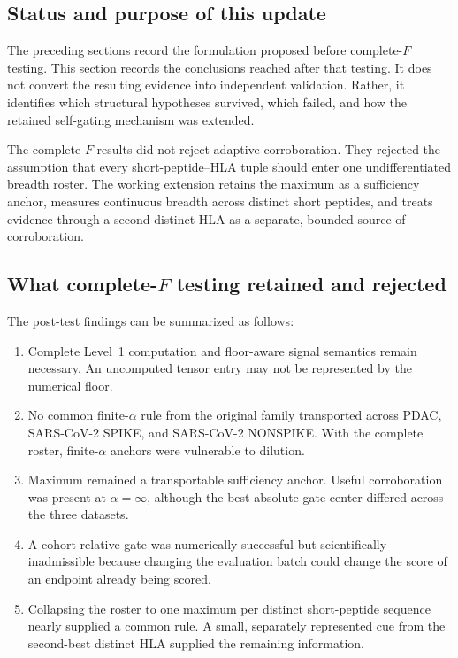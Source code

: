 \documentclass[11pt]{article}
\begin{document}
\subsection{Status and purpose of this update}

The preceding sections record the formulation proposed before complete-$F$
testing. This section records the conclusions reached after that testing. It
does not convert the resulting evidence into independent validation. Rather,
it identifies which structural hypotheses survived, which failed, and how the
retained self-gating mechanism was extended.

The complete-$F$ results did not reject adaptive corroboration. They rejected
the assumption that every short-peptide--HLA tuple should enter one
undifferentiated breadth roster. The working extension retains the maximum as
a sufficiency anchor, measures continuous breadth across distinct short
peptides, and treats evidence through a second distinct HLA as a separate,
bounded source of corroboration.

\subsection{What complete-$F$ testing retained and rejected}

The post-test findings can be summarized as follows:
\begin{enumerate}
  \item Complete Level~1 computation and floor-aware signal semantics remain
  necessary. An uncomputed tensor entry may not be represented by the
  numerical floor.
  \item No common finite-$\alpha$ rule from the original family transported
  across PDAC, SARS-CoV-2 SPIKE, and SARS-CoV-2 NONSPIKE. With the complete
  roster, finite-$\alpha$ anchors were vulnerable to dilution.
  \item Maximum remained a transportable sufficiency anchor. Useful
  corroboration was present at $\alpha=\infty$, although the best absolute
  gate center differed across the three datasets.
  \item A cohort-relative gate was numerically successful but scientifically
  inadmissible because changing the evaluation batch could change the score of
  an endpoint already being scored.
  \item Collapsing the roster to one maximum per distinct short-peptide
  sequence nearly supplied a common rule. A small, separately represented cue
  from the second-best distinct HLA supplied the remaining information.
\end{enumerate}
\end{document}
